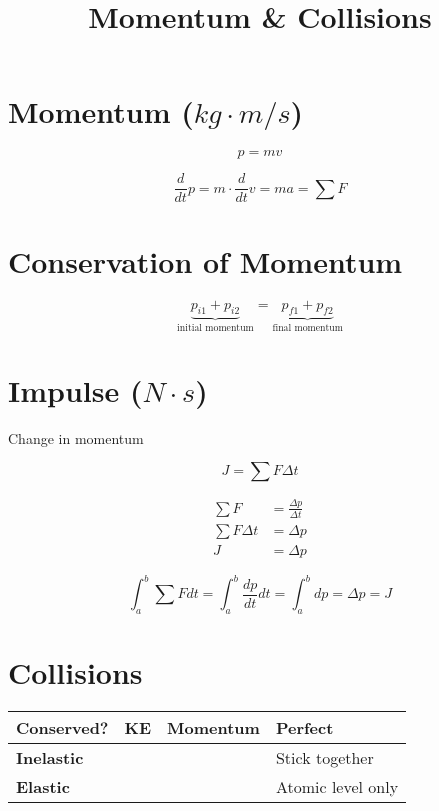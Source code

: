 \documentclass[12pt]{article}
\title{\textbf{Momentum \& Collisions}}
\date{}
\newcommand{\tick}{\ding{52}}
\newcommand{\cross}{\ding{54}}
\begin{document}
\maketitle

\begin{spacing}{1.5}

\section{Momentum ($kg \cdot m/s$)}

\begin{equation}
	\boxed{p = mv}
\end{equation}

\begin{equation}
	\boxed{\frac{d}{dt} p = m \cdot \frac{d}{dt} v = ma = \sum{F}}
\end{equation}

\section{Conservation of Momentum}

$$\underbrace{p_{i1} + p_{i2}}_{\text{initial momentum}} = \underbrace{p_{f1} + p_{f2}}_{\text{final momentum}}$$

\section{Impulse ($N \cdot s$)}

Change in momentum

\begin{equation}
	\boxed{J = \sum F \Delta t}
\end{equation}

\begin{align}
\sum F &= \frac{\Delta p}{\Delta t} \\
\sum F \Delta t &= \Delta p \\
J &= \Delta p
\end{align}

\begin{equation}
	\boxed{\int_a^b \sum F {dt} = \int_a^b \frac{dp}{dt} {dt} = \int_a^b {dp} = \Delta p= J}
\end{equation}

\section{Collisions}

\begin{tabular}{l | cc | l}
	\textbf{Conserved?} & \textbf{KE} & \textbf{Momentum}& \textbf{Perfect} \\
	\hline
	\textbf{Inelastic} & \cross & \tick & Stick together \\
	\textbf{Elastic} & \tick & \tick & Atomic level only \\
\end{tabular}


\end{spacing}
\end{document}
